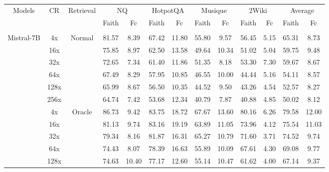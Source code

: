 \documentclass{applemlr}
\numberwithin{equation}{section}
\begin{document}
\begin{table}[H]
\scriptsize
\centering
\begin{tabular}{c|c|c|cc|cc|cc|cc|cc}
\hline
 \multirow{2}{*}{Models} & \multirow{2}{*}{CR} & \multirow{2}{*}{Retrieval}
& \multicolumn{2}{c|}{NQ}
& \multicolumn{2}{c|}{HotpotQA}
& \multicolumn{2}{c|}{Musique}
& \multicolumn{2}{c|}{2Wiki}
& \multicolumn{2}{c|}{Average} \\
\cline{4-13}
&  & & Faith & Fc
 & Faith & Fc
 & Faith & Fc
 & Faith & Fc
 & Faith & Fc \\
\hline
\rowcolor{gray!15}
\multicolumn{13}{c}{\textbf{Pretraining-initialized}} \\
\multirow{12}{*}{ Mistral-7B }& 4x & \multirow{6}{*}{ Normal} & 81.57 & 8.39 & 67.42 & 11.80 & 55.80 & 9.57 & 56.45 & 5.15 & 65.31 & 8.73 \\
 & 16x & & 75.85 & 8.97 & 62.50 & 13.58 & 49.64 & 10.34 & 51.02 & 5.04 & 59.75 & 9.48 \\
  & 32x &  & 72.65 & 7.34 & 61.40 & 11.86 & 51.35 & 8.18 & 53.30 & 7.30 & 59.67 & 8.67 \\
  & 64x &  & 67.49 & 8.29 & 57.95 & 10.85 & 46.55 & 10.00 & 44.44 & 5.16 & 54.11 & 8.57 \\
  & 128x &  & 65.99 & 8.67 & 56.50 & 10.35 & 44.52 & 9.50 & 43.26 & 4.54 & 52.57 & 8.27 \\
  & 256x &  & 64.74 & 7.42 & 53.68 & 12.34 & 40.79 & 7.87 & 40.88 & 4.85 & 50.02 & 8.12 \\
 \cline{2-13}
        &4x  & \multirow{6}{*}{Oracle} & 86.73 & 9.42 & 83.75 & 18.72 & 67.67 & 13.60 & 80.16 & 6.26 & 79.58 & 12.00 \\

   & 16x &  & 81.13 & 9.74 & 83.16 & 19.19 & 63.89 & 11.05 & 73.96 & 4.12 & 75.54 & 11.03 \\

   & 32x &  & 79.34 & 8.16 & 81.87 & 16.31 & 65.27 & 10.79 & 71.60 & 3.71 & 74.52 & 9.74 \\

   & 64x &  & 74.43 & 8.07 & 78.39 & 16.63 & 55.89 & 10.09 & 67.61 & 4.30 & 69.08 & 9.77 \\

   & 128x &  & 74.63 & 10.40 & 77.17 & 12.60 & 55.14 & 10.47 & 61.62 & 4.00 & 67.14 & 9.37 \\


\end{tabular}
\end{table}
\end{document}
